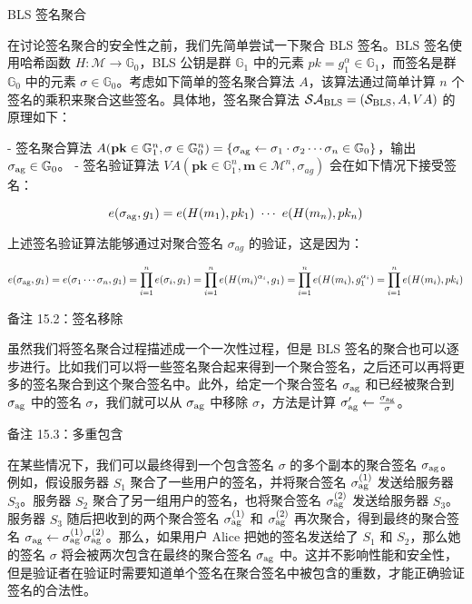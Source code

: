 BLS 签名聚合

在讨论签名聚合的安全性之前，我们先简单尝试一下聚合 BLS 签名。BLS 签名使用哈希函数 $H: \mathcal{M} \rightarrow \mathbb{G}_0$，BLS 公钥是群 $\mathbb{G}_1$ 中的元素 $pk=g_1^\alpha \in \mathbb{G}_1$，而签名是群 $\mathbb{G}_0$ 中的元素 $\sigma \in \mathbb{G}_0$。考虑如下简单的签名聚合算法 $A$，该算法通过简单计算 $n$ 个签名的乘积来聚合这些签名。具体地，签名聚合算法 $\mathcal{SA}_{\rm BLS}=(\mathcal{S}_{\rm BLS},A,VA)$ 的原理如下：

- 签名聚合算法 $A(\mathbf{pk}\in\mathbb{G}_1^n,\mathbf\sigma\in\mathbb{G}_0^n) = \{\sigma_{\rm ag}\leftarrow \sigma_1 \cdot \sigma_2 \cdots \sigma_n \in \mathbb{G}_0\}$，输出 $\sigma_{\rm ag}\in\mathbb{G}_0$。
- 签名验证算法 $VA(\mathbf{pk}\in\mathbb{G}_1^n,\mathbf{m}\in\mathcal{M}^n,\sigma_{ag})$ 会在如下情况下接受签名：
    
    $$
    e(\sigma_{\rm ag},g_1)=e(H(m_1),pk_1)~\cdots~e(H(m_n),pk_n)
    $$
    

上述签名验证算法能够通过对聚合签名 $\sigma_{ag}$ 的验证，这是因为：

$$
e(\sigma_{\rm ag},g_1)=e(\sigma_1\cdots\sigma_n,g_1) = \prod_{i=1}^{n}e(\sigma_i,g_1)=\prod_{i=1}^{n}e(H(m_i)^{\alpha_i},g_1)\\
=\prod_{i=1}^{n}e(H(m_i),g_1^{\alpha_i}) = \prod_{i=1}^{n}e(H(m_i),pk_i)
$$

备注 15.2：签名移除

虽然我们将签名聚合过程描述成一个一次性过程，但是 BLS 签名的聚合也可以逐步进行。比如我们可以将一些签名聚合起来得到一个聚合签名，之后还可以再将更多的签名聚合到这个聚合签名中。此外，给定一个聚合签名 $\sigma_{\rm ag}$ 和已经被聚合到 $\sigma_{\rm ag}$ 中的签名 $\sigma$，我们就可以从 $\sigma_{\rm ag}$ 中移除 $\sigma$，方法是计算 $\sigma_{\rm ag}'\leftarrow \frac{\sigma_{\rm ag}}{\sigma}$。

备注 15.3：多重包含

在某些情况下，我们可以最终得到一个包含签名 $\sigma$ 的多个副本的聚合签名 $\sigma_{\rm ag}$。例如，假设服务器 $S_1$ 聚合了一些用户的签名，并将聚合签名 $\sigma_{\rm ag}^{(1)}$ 发送给服务器 $S_3$。服务器 $S_2$ 聚合了另一组用户的签名，也将聚合签名 $\sigma_{\rm ag}^{(2)}$ 发送给服务器 $S_3$。服务器 $S_3$ 随后把收到的两个聚合签名 $\sigma_{\rm ag}^{(1)}$ 和 $\sigma_{\rm ag}^{(2)}$ 再次聚合，得到最终的聚合签名 $\sigma_{\rm ag}\leftarrow \sigma_{\rm ag}^{(1)} \sigma_{\rm ag}^{(2)}$。那么，如果用户 Alice 把她的签名发送给了 $S_1$ 和 $S_2$，那么她的签名 $\sigma$ 将会被两次包含在最终的聚合签名 $\sigma_{\rm ag}$ 中。这并不影响性能和安全性，但是验证者在验证时需要知道单个签名在聚合签名中被包含的重数，才能正确验证签名的合法性。

